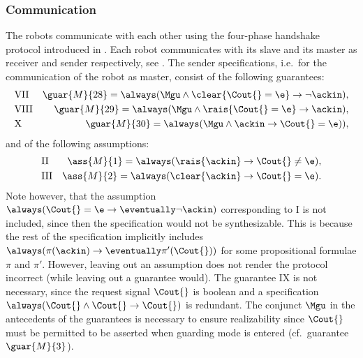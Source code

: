 \subsubsection{Communication}

The robots communicate with each other using the four-phase handshake protocol introduced in . Each robot communicates with its slave and its master as receiver and sender respectively, see . The sender specifications, i.e.\ for the communication of the robot as master, consist of the following guarantees:
\begin{eqnarray*}
	&\mathrm{VII} &\guar{M}{28} = \always(\Mgu \wedge \clear{\Cout{}=\e} \rightarrow \neg\ackin), \\
	&\mathrm{VIII} &\guar{M}{29} = \always(\Mgu \wedge \rais{\Cout{}=\e} \rightarrow \ackin),\\
	&\mathrm{X} &\guar{M}{30} = \always(\Mgu \wedge \ackin \rightarrow \next(\Cout{}=\e)),
\end{eqnarray*}
and of the following assumptions:
\begin{eqnarray*}
	&\mathrm{II} &\ass{M}{1} = \always(\rais{\ackin} \rightarrow \Cout{}\neq\e), \\
	&\mathrm{III} &\ass{M}{2} = \always(\clear{\ackin} \rightarrow \Cout{}=\e).
\end{eqnarray*}
Note however, that the assumption $\always(\Cout{}=\e \rightarrow \eventually\neg\ackin)$ corresponding to I is not included, since then the specification would not be synthesizable. This is because the rest of the specification implicitly includes $\always(\pi(\ackin) \rightarrow \eventually\pi'(\Cout{}))$ for some propositional formulae $\pi$ and $\pi'$. However, leaving out an assumption does not render the protocol incorrect (while leaving out a guarantee would). The guarantee IX is not necessary, since the request signal $\Cout{}$ is boolean and a specification $\always(\Cout{} \wedge \next\neg\Cout{} \rightarrow \next\neg\Cout{})$ is redundant. The conjunct $\Mgu$ in the antecedents of the guarantees is necessary to ensure realizability since $\Cout{}$ must be permitted to be asserted when guarding mode is entered (cf.\ guarantee $\guar{M}{3}$).\\

